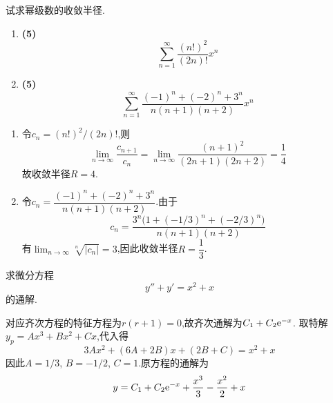 \documentclass{ctexart}
\begin{document}
\begin{problem}[2.(10\songti{分})]
试求幂级数的收敛半径.
        \begin{enumerate}[label=\tbf{(\arabic*)},topsep=0pt,parsep=0pt,itemsep=0pt,partopsep=0pt]
            \item \textbf{(5)}
                \[\sum_{n=1}^{\infty}\dfrac{\left(n!\right)^2}{(2n)!}x^n\]
            \item \textbf{(5)}
                \[\sum_{n=1}^{\infty}\dfrac{(-1)^n+(-2)^n+3^n}{n(n+1)(n+2)}x^n\]

        \end{enumerate}
\end{problem}
\begin{solution}
\begin{enumerate}[label=\tbf{(\arabic*)},topsep=0pt,parsep=0pt,itemsep=0pt,partopsep=0pt]
\item 令$c_n=(n!)^2/(2n)!$,则
\[\lim_{n\to\infty}\frac{c_{n+1}}{c_n}
=\lim_{n\to\infty}\frac{(n+1)^2}{(2n+1)(2n+2)}=\frac14\]
故收敛半径$R=4$.
\item 令$c_n=\dfrac{(-1)^n+(-2)^n+3^n}{n(n+1)(n+2)}$.由于
\[c_n=\frac{3^n\bigl(1+(-1/3)^n+(-2/3)^n\bigr)}{n(n+1)(n+2)}\]
有$\displaystyle\lim_{n\to\infty}\sqrt[n]{|c_n|}=3$,因此收敛半径$R=\dfrac13$.
\end{enumerate}
\end{solution}

\begin{problem}[3.(10\songti{分})]
求微分方程
        \[y''+y'=x^2+x\]
        的通解.
\end{problem}
\begin{solution}
对应齐次方程的特征方程为$r(r+1)=0$,故齐次通解为$C_1+C_2\mathrm{e}^{-x}$.
取特解$y_p=Ax^3+Bx^2+Cx$,代入得
\[3Ax^2+(6A+2B)x+(2B+C)=x^2+x\]
因此$A=1/3$, $B=-1/2$, $C=1$.原方程的通解为
\[y=C_1+C_2\mathrm{e}^{-x}+\frac{x^3}{3}-\frac{x^2}{2}+x\]
\end{solution}
\end{document}
